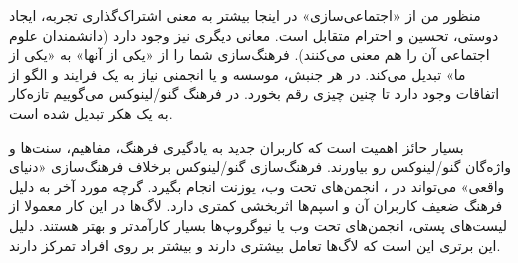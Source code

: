 
منظور من از «اجتماعی‌سازی» در اینجا بیشتر به معنی اشتراک‌گذاری تجربه،
ایجاد دوستی، تحسین و احترام متقابل است. معانی دیگری نیز وجود دارد
(دانشمندان علوم اجتماعی آن را
هم معنی می‌کنند).
فرهنگ‌سازی شما را از «یکی از آنها» به «یکی از ما» تبدیل می‌کند.
در هر جنبش، موسسه و یا انجمنی نیاز به یک فرایند و الگو از اتفاقات وجود دارد
تا چنین چیزی رقم بخورد. در فرهنگ گنو/لینوکس می‌گوییم تازه‌کار به یک هکر تبدیل شده است.


بسیار حائز اهمیت است که کاربران جدید به یادگیری فرهنگ، مفاهیم، سنت‌ها
و واژه‌گان گنو/لینوکس رو بیاورند. فرهنگ‌سازی گنو/لینوکس برخلاف فرهنگ‌سازی «دنیای واقعی»
می‌تواند در
،
انجمن‌های تحت وب، یوزنت انجام بگیرد. گرچه مورد آخر به دلیل فرهنگ ضعیف کاربران آن
و اسپم‌ها اثربخشی کمتری دارد.
لاگ‌ها در این کار معمولا از لیست‌های پستی، انجمن‌های تحت وب یا نیوگروپ‌ها بسیار کارآمدتر
و بهتر هستند. دلیل این برتری این است که لاگ‌ها تعامل بیشتری دارند و بیشتر بر روی
افراد تمرکز دارند.

